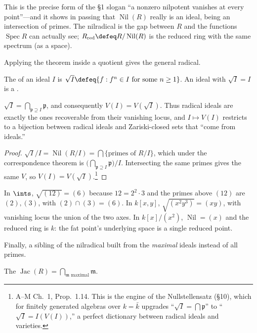 \documentclass[11pt]{article}
\DeclareMathOperator{\Spec}{Spec}
\DeclareMathOperator{\Nil}{Nil}
\DeclareMathOperator{\Jac}{Jac}
\newcommand{\mfp}{\mathfrak{p}}
\newcommand{\mfm}{\mathfrak{m}}
\begin{document}
This is the precise form of the \S1 slogan ``a nonzero nilpotent vanishes at every point''---and
it shows in passing that $\Nil(R)$ really is an ideal, being an intersection of primes.
The nilradical is the gap between $R$ and the functions $\Spec R$ can actually see;
$R_{\mathrm{red}}\defeq R/\Nil(R)$ is the reduced ring with the same spectrum (as a space).

Applying the theorem inside a quotient gives the general radical.

\begin{ddefinition}
The  of an ideal $I$ is $\sqrt{I}\defeq\{f: f^n\in I \text{ for some } n\ge1\}$.
An ideal with $\sqrt{I}=I$ is a .
\end{ddefinition}

\begin{pproposition}[Radical $=$ intersection of the primes above $I$]
$\sqrt{I}=\bigcap_{\mfp\supseteq I}\mfp$, and consequently $V(I)=V(\sqrt I)$. Thus radical
ideals are exactly the ones recoverable from their vanishing locus, and
$I\mapsto V(I)$ restricts to a bijection between radical ideals and Zariski-closed sets that
``come from ideals.''
\end{pproposition}

\begin{proof}
$\sqrt I/I=\Nil(R/I)=\bigcap\{\text{primes of }R/I\}$, which under the correspondence theorem
is $\big(\bigcap_{\mfp\supseteq I}\mfp\big)/I$. Intersecting the same primes gives the same
$V$, so $V(I)=V(\sqrt I)$.\footnote{A--M Ch.~1, Prop.\ 1.14. This is the engine of the
Nullstellensatz (\S10), which for finitely generated algebras over $k=\bar k$ upgrades
``$\sqrt I=\bigcap \mfp$'' to ``$\sqrt I=I(V(I))$,'' a perfect dictionary between radical
ideals and varieties.}
\end{proof}

\begin{eexample}
In $\ints$, $\sqrt{(12)}=(6)$ because $12=2^2\cdot 3$ and the primes above $(12)$ are
$(2),(3)$, with $(2)\cap(3)=(6)$. In $k[x,y]$, $\sqrt{(x^2y^3)}=(xy)$, with vanishing locus
the union of the two axes. In $k[x]/(x^2)$, $\Nil=(x)$ and the reduced ring is $k$: the fat
point's underlying space is a single reduced point.
\end{eexample}

Finally, a sibling of the nilradical built from the \emph{maximal} ideals instead of all
primes.

\begin{ddefinition}
The  $\Jac(R)=\bigcap_{\mfm \text{ maximal}}\mfm$.
\end{ddefinition}
\end{document}
